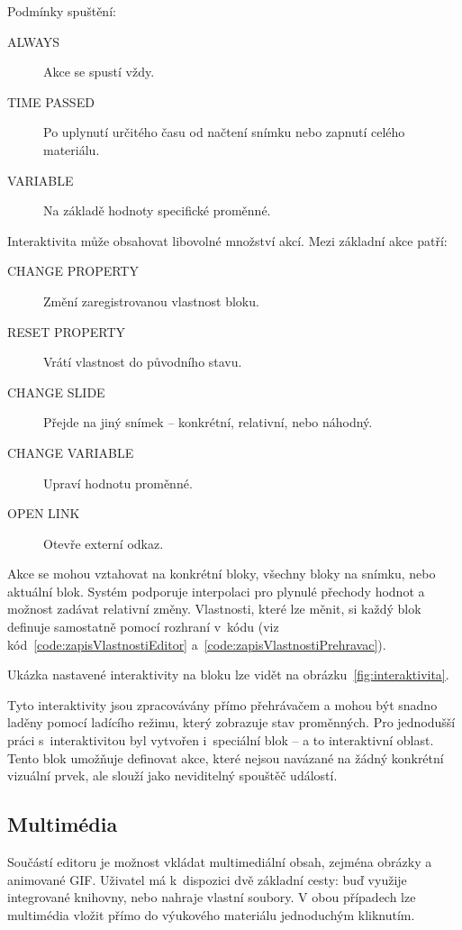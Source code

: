 Podmínky spuštění:
\begin{description}
  \item[ALWAYS] Akce se spustí vždy.
  \item[TIME PASSED] Po uplynutí určitého času od načtení snímku nebo zapnutí celého materiálu.
  \item[VARIABLE] Na základě hodnoty specifické proměnné.
\end{description}

Interaktivita může obsahovat libovolné množství akcí. Mezi základní akce patří:

\begin{description}
  \item[CHANGE PROPERTY] Změní zaregistrovanou vlastnost bloku.
  \item[RESET PROPERTY] Vrátí vlastnost do původního stavu.
  \item[CHANGE SLIDE] Přejde na jiný snímek – konkrétní, relativní, nebo náhodný.
  \item[CHANGE VARIABLE] Upraví hodnotu proměnné.
  \item[OPEN LINK] Otevře externí odkaz.
\end{description}

Akce se mohou vztahovat na konkrétní bloky, všechny bloky na snímku, nebo aktuální blok. 
Systém podporuje interpolaci pro plynulé přechody hodnot a možnost zadávat relativní změny.
Vlastnosti, které lze měnit, si každý blok definuje samostatně pomocí rozhraní v~kódu (viz kód~\ref{code:zapisVlastnostiEditor} a~\ref{code:zapisVlastnostiPrehravac}).

Ukázka nastavené interaktivity na bloku lze vidět na obrázku~\ref{fig:interaktivita}.

Tyto interaktivity jsou zpracovávány přímo přehrávačem a mohou být snadno laděny pomocí ladícího režimu, který zobrazuje stav proměnných. 
Pro jednodušší práci s~interaktivitou byl vytvořen i~speciální blok -- a to interaktivní oblast.
Tento blok umožňuje definovat akce, které nejsou navázané na žádný konkrétní vizuální prvek, ale slouží jako neviditelný spouštěč událostí.

\subsection{Multimédia}

Součástí editoru je možnost vkládat multimediální obsah, zejména obrázky a animované GIF.
Uživatel má k~dispozici dvě základní cesty: buď využije integrované knihovny, nebo nahraje vlastní soubory. 
V obou případech lze multimédia vložit přímo do výukového materiálu jednoduchým kliknutím.

